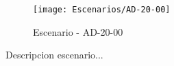 \begin{figure}[H]
\centering
\texttt{[image: Escenarios/AD-20-00]}
\caption{Escenario - AD-20-00}
\label{fig:AD-20-00}
\end{figure}

Descripcion escenario...
\clearpage
